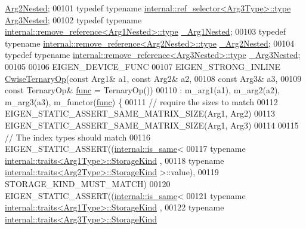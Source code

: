 \begin{DoxyCode}
      \hyperlink{class_eigen_1_1internal_1_1_tensor_lazy_evaluator_writable}{Arg2Nested};
00101   \textcolor{keyword}{typedef} \textcolor{keyword}{typename} \hyperlink{class_eigen_1_1internal_1_1_tensor_lazy_evaluator_writable}{internal::ref\_selector<Arg3Type>::type} 
      \hyperlink{class_eigen_1_1internal_1_1_tensor_lazy_evaluator_writable}{Arg3Nested};
00102   \textcolor{keyword}{typedef} \textcolor{keyword}{typename} \hyperlink{group___sparse_core___module}{internal::remove\_reference<Arg1Nested>::type}
       \hyperlink{group___sparse_core___module}{\_Arg1Nested};
00103   \textcolor{keyword}{typedef} \textcolor{keyword}{typename} \hyperlink{group___sparse_core___module}{internal::remove\_reference<Arg2Nested>::type}
       \hyperlink{group___sparse_core___module}{\_Arg2Nested};
00104   \textcolor{keyword}{typedef} \textcolor{keyword}{typename} \hyperlink{group___sparse_core___module}{internal::remove\_reference<Arg3Nested>::type}
       \hyperlink{group___sparse_core___module}{\_Arg3Nested};
00105 
00106   EIGEN\_DEVICE\_FUNC
00107   EIGEN\_STRONG\_INLINE \hyperlink{group___core___module_class_eigen_1_1_cwise_ternary_op}{CwiseTernaryOp}(\textcolor{keyword}{const} Arg1& a1, \textcolor{keyword}{const} Arg2& a2,
00108                                      \textcolor{keyword}{const} Arg3& a3,
00109                                      \textcolor{keyword}{const} TernaryOp& \hyperlink{structfunc}{func} = TernaryOp())
00110       : m\_arg1(a1), m\_arg2(a2), m\_arg3(a3), m\_functor(\hyperlink{structfunc}{func}) \{
00111     \textcolor{comment}{// require the sizes to match}
00112     EIGEN\_STATIC\_ASSERT\_SAME\_MATRIX\_SIZE(Arg1, Arg2)
00113     EIGEN\_STATIC\_ASSERT\_SAME\_MATRIX\_SIZE(Arg1, Arg3)
00114 
00115     \textcolor{comment}{// The index types should match}
00116     EIGEN\_STATIC\_ASSERT((\hyperlink{struct_eigen_1_1internal_1_1is__same}{internal::is\_same}<
00117                          \textcolor{keyword}{typename} \hyperlink{struct_eigen_1_1internal_1_1traits}{internal::traits<Arg1Type>::StorageKind}
      ,
00118                          \textcolor{keyword}{typename} \hyperlink{struct_eigen_1_1internal_1_1traits}{internal::traits<Arg2Type>::StorageKind}
      >::value),
00119                         STORAGE\_KIND\_MUST\_MATCH)
00120     EIGEN\_STATIC\_ASSERT((\hyperlink{struct_eigen_1_1internal_1_1is__same}{internal::is\_same}<
00121                          \textcolor{keyword}{typename} \hyperlink{struct_eigen_1_1internal_1_1traits}{internal::traits<Arg1Type>::StorageKind}
      ,
00122                          \textcolor{keyword}{typename} \hyperlink{struct_eigen_1_1internal_1_1traits}{internal::traits<Arg3Type>::StorageKind}

\end{DoxyCode}
